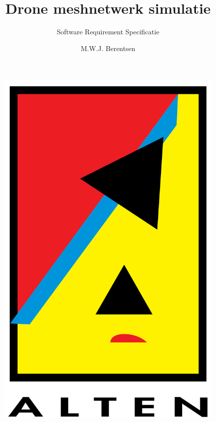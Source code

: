 \documentclass[a4paper, 11pt, oneside]{report}
\author{M.W.J. Berentsen}
\title{\myfont Drone meshnetwerk simulatie}
\subtitle{Software Requirement Specificatie}{Versie 2.0}{Alten Nederland B.V.}{Hogeschool van Arnhem en Nijmegen}{HBO Technische Informatica - Embedded Software Developement }{MWJ.Berentsen@student.han.nl}{Studentnummer: 561399}{Docent: J. Visch, MSc}{Assessor: ir. C.G.R. van Uffelen}
\begin{document}
\begin{figure}
\begin{center}\includegraphics[scale=0.1]{alten}\end{center}
\end{figure}
\maketitle

\end{document}
